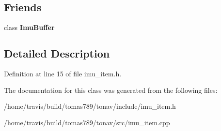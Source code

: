 \subsection*{Friends}
\begin{DoxyCompactItemize}
\item 
\hypertarget{class_imu_item_affcdaeabb9b33248d9efdf687f2eab5c}{class {\bfseries Imu\-Buffer}}\label{class_imu_item_affcdaeabb9b33248d9efdf687f2eab5c}

\end{DoxyCompactItemize}


\subsection{Detailed Description}


Definition at line 15 of file imu\-\_\-item.\-h.



The documentation for this class was generated from the following files\-:\begin{DoxyCompactItemize}
\item 
/home/travis/build/tomas789/tonav/include/imu\-\_\-item.\-h\item 
/home/travis/build/tomas789/tonav/src/imu\-\_\-item.\-cpp\end{DoxyCompactItemize}
